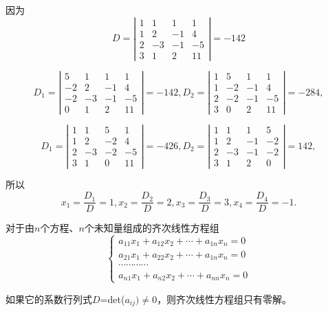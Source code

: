 \begin{solution}
    因为
$$D=\left|\begin{array}{ccccccc}
        1 & 1  & 1  & 1  \\
        1 & 2  & -1 & 4  \\
        2 & -3 & -1 & -5 \\
        3 & 1  & 2  & 11
    \end{array}\right|=-142$$

$$D_1=\left|\begin{array}{ccccccc}
        5  & 1  & 1  & 1  \\
        -2 & 2  & -1 & 4  \\
        -2 & -3 & -1 & -5 \\
        0  & 1  & 2  & 11
    \end{array}\right|=-142,D_2=\left|\begin{array}{ccccccc}
        1 & 5  & 1  & 1  \\
        1 & -2 & -1 & 4  \\
        2 & -2 & -1 & -5 \\
        3 & 0  & 2  & 11
    \end{array}\right|=-284,
$$

$$D_1=\left|\begin{array}{ccccccc}
        1 & 1  & 5  & 1  \\
        1 & 2  & -2 & 4  \\
        2 & -3 & -2 & -5 \\
        3 & 1  & 0  & 11
    \end{array}\right|=-426,D_2=\left|\begin{array}{ccccccc}
        1 & 1  & 1  & 5  \\
        1 & 2  & -1 & -2 \\
        2 & -3 & -1 & -2 \\
        3 & 1  & 2  & 0
    \end{array}\right|=142,
$$

所以
$$
    x_1=\frac{D_1}{D}=1,x_2=\frac{D_2}{D}=2,x_3=\frac{D_3}{D}=3,x_4=\frac{D_4}{D}=-1.
$$
\end{solution}

\begin{tuilun}
    对于由$n$个方程、$n$个未知量组成的齐次线性方程组
\begin{equation}
    \left\{
    \begin{array}{c}
        a_{11}x_1+a_{12}x_2+\cdots+a_{1n}x_{n}=0 \\
        a_{21}x_1+a_{22}x_2+\cdots+a_{1n}x_{n}=0 \\
        \cdots\cdots\cdots\cdots                 \\
        a_{n1}x_1+a_{n2}x_2+\cdots+a_{nn}x_{n}=0
    \end{array}
    \right.
\end{equation}

如果它的系数行列式$D$=det($a_{ij})\ne0$，则齐次线性方程组只有零解。
\end{tuilun}

